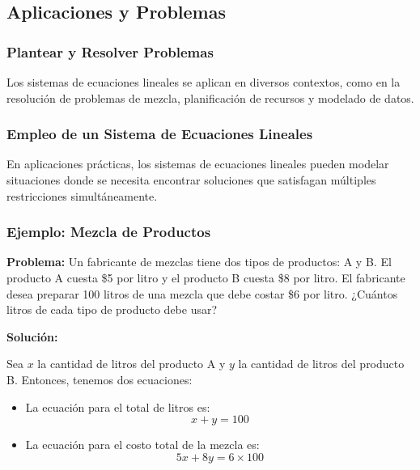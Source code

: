     \subsection{Aplicaciones y Problemas}
    
    \subsubsection{Plantear y Resolver Problemas}
    
    Los sistemas de ecuaciones lineales se aplican en diversos contextos, como en la resolución de problemas de mezcla, planificación de recursos y modelado de datos.
    
    \subsubsection{Empleo de un Sistema de Ecuaciones Lineales}
    
    En aplicaciones prácticas, los sistemas de ecuaciones lineales pueden modelar situaciones donde se necesita encontrar soluciones que satisfagan múltiples restricciones simultáneamente.
    
    
    
     
    
    \subsubsection{Ejemplo: Mezcla de Productos}
    
    \textbf{Problema:} Un fabricante de mezclas tiene dos tipos de productos: A y B. El producto A cuesta \$5 por litro y el producto B cuesta \$8 por litro. El fabricante desea preparar 100 litros de una mezcla que debe costar \$6 por litro. ¿Cuántos litros de cada tipo de producto debe usar?
    
    \textbf{Solución:}
    
    Sea \( x \) la cantidad de litros del producto A y \( y \) la cantidad de litros del producto B. Entonces, tenemos dos ecuaciones:
    
    \begin{itemize}
        \item La ecuación para el total de litros es:
        \[
        x + y = 100
        \]
        \item La ecuación para el costo total de la mezcla es:
        \[
        5x + 8y = 6 \times 100
        \]
    \end{itemize}
    
